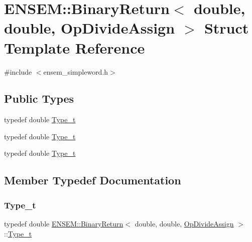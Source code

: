 \hypertarget{structENSEM_1_1BinaryReturn_3_01double_00_01double_00_01OpDivideAssign_01_4}{}\section{E\+N\+S\+EM\+:\+:Binary\+Return$<$ double, double, Op\+Divide\+Assign $>$ Struct Template Reference}
\label{structENSEM_1_1BinaryReturn_3_01double_00_01double_00_01OpDivideAssign_01_4}


{\ttfamily \#include $<$ensem\+\_\+simpleword.\+h$>$}

\subsection*{Public Types}
\begin{DoxyCompactItemize}
\item 
typedef double \mbox{\hyperlink{structENSEM_1_1BinaryReturn_3_01double_00_01double_00_01OpDivideAssign_01_4_aa4a7939a8bbedada7f3b6703da6902f7}{Type\+\_\+t}}
\item 
typedef double \mbox{\hyperlink{structENSEM_1_1BinaryReturn_3_01double_00_01double_00_01OpDivideAssign_01_4_aa4a7939a8bbedada7f3b6703da6902f7}{Type\+\_\+t}}
\item 
typedef double \mbox{\hyperlink{structENSEM_1_1BinaryReturn_3_01double_00_01double_00_01OpDivideAssign_01_4_aa4a7939a8bbedada7f3b6703da6902f7}{Type\+\_\+t}}
\end{DoxyCompactItemize}


\subsection{Member Typedef Documentation}
\mbox{\label{structENSEM_1_1BinaryReturn_3_01double_00_01double_00_01OpDivideAssign_01_4_aa4a7939a8bbedada7f3b6703da6902f7}} 
\subsubsection{\texorpdfstring{Type\_t}{Type\_t}\hspace{0.1cm}{\footnotesize\ttfamily [1/3]}}
{\footnotesize\ttfamily typedef double \mbox{\hyperlink{structENSEM_1_1BinaryReturn}{E\+N\+S\+E\+M\+::\+Binary\+Return}}$<$ double, double, \mbox{\hyperlink{structENSEM_1_1OpDivideAssign}{Op\+Divide\+Assign}} $>$\+::\mbox{\hyperlink{structENSEM_1_1BinaryReturn_3_01double_00_01double_00_01OpDivideAssign_01_4_aa4a7939a8bbedada7f3b6703da6902f7}{Type\+\_\+t}}}

